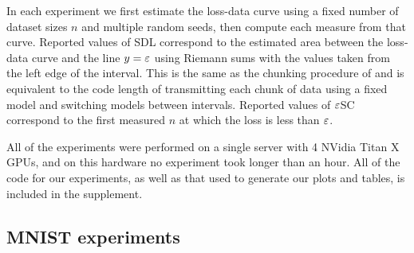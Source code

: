 \begin{subappendices}


 \label{sec:experiment_details}

In each experiment we first estimate the loss-data curve using a fixed number of dataset sizes $n$ and multiple random seeds, then compute each measure from that curve.
Reported values of SDL correspond to the estimated area between the loss-data curve and the line $y=\varepsilon$ using Riemann sums with the values taken from the left edge of the interval.
This is the same as the chunking procedure of \citet{Voita2020InformationTheoreticPW} and is equivalent to the code length of transmitting each chunk of data using a fixed model and switching models between intervals.
Reported values of $\varepsilon$SC correspond to the first measured $n$ at which the loss is less than $\varepsilon$.

All of the experiments were performed on a single server with 4 NVidia Titan X GPUs, and on this hardware no experiment took longer than an hour.
All of the code for our experiments, as well as that used to generate our plots and tables, is included in the supplement.


\subsection{MNIST experiments}


\end{subappendices}
